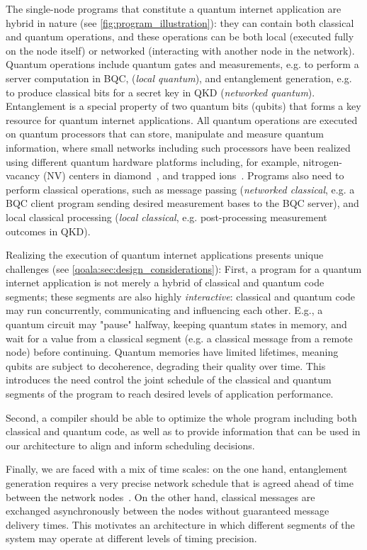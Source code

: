 The single-node programs that constitute a quantum internet application are hybrid in nature (see \cref{fig:program_illustration}):
they can contain both classical and quantum operations, and these operations can be both local (executed fully on the node itself) or networked (interacting with another node in the network).
Quantum operations include quantum gates and measurements, e.g. to perform a server computation in BQC, (\textit{local quantum}), and entanglement generation, e.g. to produce classical bits for a secret key in QKD (\textit{networked quantum}).
Entanglement is a special property of two quantum bits (qubits) that forms a key resource for quantum internet applications. 
All quantum operations are executed on quantum processors that can store, manipulate and measure quantum information, where small networks including such processors have been realized using different quantum hardware platforms including, for example,  nitrogen-vacancy (NV) centers in diamond~\cite{pompili2021realization}, and trapped ions~\cite{krutyanskiy2023entanglement}.
Programs also need to perform classical operations, such as message passing (\textit{networked classical}, e.g. a BQC client program sending desired measurement bases to the BQC server), and local classical processing (\textit{local classical}, e.g. post-processing measurement outcomes in QKD).

Realizing the execution of quantum internet applications presents unique challenges (see \cref{qoala:sec:design_considerations}): 
First, a program for a quantum internet application is not merely a hybrid of classical and quantum code segments; these segments are also highly \textit{interactive}: classical and quantum code may run concurrently, communicating and influencing each other.
E.g., a quantum circuit may "pause" halfway, keeping quantum states in memory, and wait for a value from a classical segment (e.g. a classical message from a remote node) before continuing.
Quantum memories have limited lifetimes, meaning qubits are subject to decoherence, degrading their quality over time. This introduces the need 
control the joint schedule of the classical and quantum segments of the program to reach desired levels of application performance.

Second, a compiler should be able to optimize the whole program including both classical and quantum code, as well as to provide information that can be used in our architecture to align and inform scheduling decisions. 

Finally, we are faced with a mix of time scales:
on the one hand, entanglement generation requires a very precise network schedule that is agreed ahead of time between the network nodes~\cite{dahlberg2019link}. On the other hand, classical messages are exchanged asynchronously between the nodes without guaranteed message delivery times. This motivates an architecture in which different segments of the system may operate at different levels of timing precision. 

